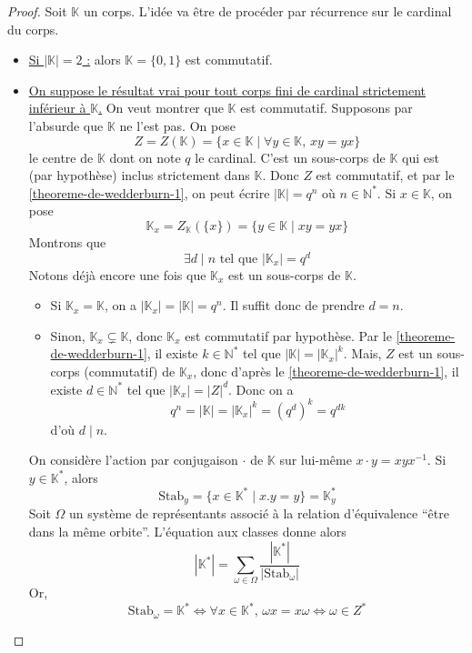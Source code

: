 	\begin{proof}
		Soit $\mathbb{K}$ un corps. L'idée va être de procéder par récurrence sur le cardinal du corps.
		\begin{itemize}
			\item \uline{Si $|\mathbb{K}| = 2$ :} alors $\mathbb{K} = \{0, 1\}$ est commutatif.
			\item \uline{On suppose le résultat vrai pour tout corps fini de cardinal strictement inférieur à $\mathbb{K}$.} On veut montrer que $\mathbb{K}$ est commutatif. Supposons par l'absurde que $\mathbb{K}$ ne l'est pas. On pose
			\[ Z = Z(\mathbb{K}) = \{ x \in \mathbb{K} \mid \forall y \in \mathbb{K}, \, xy = yx \} \]
			le centre de $\mathbb{K}$ dont on note $q$ le cardinal. C'est un sous-corps de $\mathbb{K}$ qui est (par hypothèse) inclus strictement dans $\mathbb{K}$. Donc $Z$ est commutatif, et par le \cref{theoreme-de-wedderburn-1}, on peut écrire $|\mathbb{K}| = q^n$ où $n \in \mathbb{N}^*$. Si $x \in \mathbb{K}$, on pose
			\[ \mathbb{K}_x = Z_{\mathbb{K}}(\{ x \}) = \{ y \in \mathbb{K} \mid xy = yx \} \]
			Montrons que
			\[ \exists d \mid n \text{ tel que } |\mathbb{K}_x| = q^d \tag{$*$} \]
			Notons déjà encore une fois que $\mathbb{K}_x$ est un sous-corps de $\mathbb{K}$.
			\begin{itemize}
				\item Si $\mathbb{K}_x = \mathbb{K}$, on a $|\mathbb{K}_x| = |\mathbb{K}| = q^n$. Il suffit donc de prendre $d = n$.
				\item Sinon, $\mathbb{K}_x \subsetneq \mathbb{K}$, donc $\mathbb{K}_x$ est commutatif par hypothèse. Par le \cref{theoreme-de-wedderburn-1}, il existe $k \in \mathbb{N}^*$ tel que $|\mathbb{K}| = |\mathbb{K}_x|^k$.
				\newpar
				Mais, $Z$ est un sous-corps (commutatif) de $\mathbb{K}_x$, donc d'après le \cref{theoreme-de-wedderburn-1}, il existe $d \in \mathbb{N}^*$ tel que $|\mathbb{K}_x| = |Z|^d$. Donc on a
				\[ q^n = |\mathbb{K}| = |\mathbb{K}_x|^k = (q^d)^k = q^{dk} \]
				d'où $d \mid n$.
			\end{itemize}
			On considère l'action par conjugaison $\cdot$ de $\mathbb{K}$ sur lui-même $x \cdot y = xyx^{-1}$. Si $y \in \mathbb{K}^*$, alors
			\[ \mathrm{Stab}_y = \{ x \in \mathbb{K}^* \mid x.y = y \} = \mathbb{K}_y^* \]
			Soit $\Omega$ un système de représentants associé à la relation d'équivalence ``être dans la même orbite''. L'équation aux classes donne alors
			\[ |\mathbb{K}^*| = \sum_{\omega \in \Omega} \frac{|\mathbb{K}^*|}{|\mathrm{Stab}_\omega|} \]
			Or,
			\[ \mathrm{Stab}_\omega = \mathbb{K}^* \iff \forall x \in \mathbb{K}^*, \, \omega x = x \omega \iff \omega \in Z^* \]

\end{itemize}
\end{proof}
